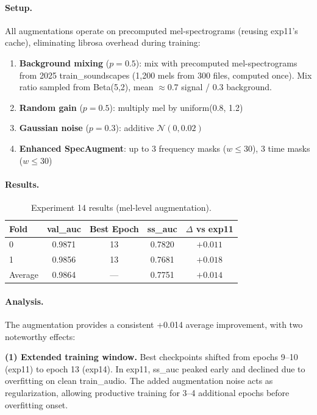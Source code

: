 \paragraph{Setup.}
All augmentations operate on precomputed mel-spectrograms (reusing exp11's
cache), eliminating librosa overhead during training:
\begin{enumerate}
    \item \textbf{Background mixing} ($p=0.5$): mix with precomputed mel-spectrograms
    from 2025 train\_soundscapes (1,200 mels from 300 files, computed once).
    Mix ratio sampled from Beta(5,2), mean $\approx$0.7 signal / 0.3 background.
    \item \textbf{Random gain} ($p=0.5$): multiply mel by uniform(0.8, 1.2)
    \item \textbf{Gaussian noise} ($p=0.3$): additive $\mathcal{N}(0, 0.02)$
    \item \textbf{Enhanced SpecAugment}: up to 3 frequency masks ($w \leq 30$),
    3 time masks ($w \leq 30$)
\end{enumerate}

\paragraph{Results.}
\begin{table}[h]
\centering
\caption{Experiment 14 results (mel-level augmentation).}
\label{tab:exp14}
\begin{tabular}{lcccc}
\hline
\textbf{Fold} & \textbf{val\_auc} & \textbf{Best Epoch} & \textbf{ss\_auc} & \textbf{$\Delta$ vs exp11} \\
\hline
0 & 0.9871 & 13 & 0.7820 & $+0.011$ \\
1 & 0.9856 & 13 & 0.7681 & $+0.018$ \\
\hline
Average & 0.9864 & --- & 0.7751 & $+0.014$ \\
\hline
\end{tabular}
\end{table}

\paragraph{Analysis.}
The augmentation provides a consistent +0.014 average improvement, with two
noteworthy effects:

\textbf{(1) Extended training window.}
Best checkpoints shifted from epochs 9--10 (exp11) to epoch 13 (exp14).
In exp11, ss\_auc peaked early and declined due to overfitting on clean
train\_audio. The added augmentation noise acts as regularization, allowing
productive training for 3--4 additional epochs before overfitting onset.

